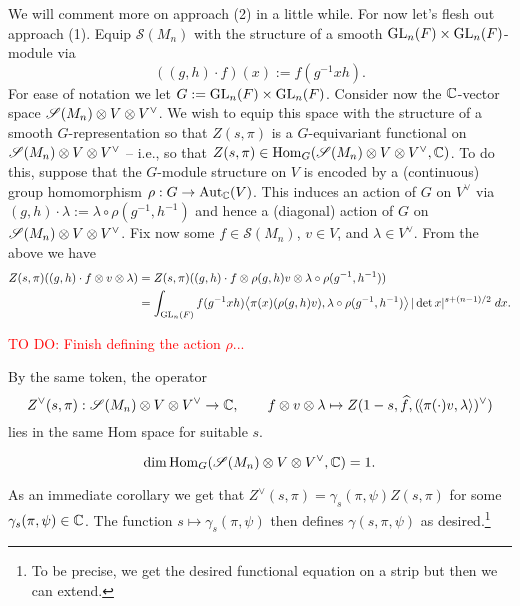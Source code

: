 \documentclass[11pt]{article}
\renewcommand{\S}{\mathscr{S}}
\begin{document}
We will comment more on approach (2) in a little while. For now let's flesh out approach (1). Equip $\S(M_n)$ with the structure of a smooth $\textup{GL}_n(F)\times\textup{GL}_n(F)$-module via
$$((g,h)\cdot f)(x):=f(g^{-1}xh).$$
For ease of notation we let $G:=\textup{GL}_n(F)\times\textup{GL}_n(F)$. Consider now the $\mathbb{C}$-vector space $\S(M_n)\tensor V\tensor V^{\vee}$. We wish to equip this space with the structure of a smooth $G$-representation so that $Z(s,\pi)$ is a $G$-equivariant functional on $\S(M_n)\tensor V\tensor V^{\vee}$ -- i.e., so that $Z(s,\pi)\in\Hom_G(\S(M_n)\tensor V\tensor V^{\vee},\C)$. To do this, suppose that the $G$-module structure on $V$ is encoded by a (continuous) group homomorphism $\rho: G\to\operatorname{Aut}_{\mathbb{C}}(V)$. This induces an action of $G$ on $V^{\vee}$ via $(g,h)\cdot\lambda:=\lambda\circ\rho(g^{-1},h^{-1})$ and hence a (diagonal) action of $G$ on $\S(M_n)\tensor V\tensor V^{\vee}$. Fix now some $f\in\S(M_n)$, $v\in V$, and $\lambda\in V^{\vee}$. From the above we have
\begin{align*}
Z(s,\pi)((g,h)\cdot f\otimes v\otimes\lambda)
&=Z(s,\pi)((g,h)\cdot f\otimes\rho(g,h)v\otimes\lambda\circ\rho(g^{-1},h^{-1})) \\
&=\int_{\textup{GL}_n(F)}f(g^{-1}xh)\!\left\langle\pi(x)(\rho(g,h)v),\lambda\circ\rho(g^{-1},h^{-1})\right\rangle|\det x|^{s+(n-1)/2}\;dx.
\end{align*}

\textcolor{red}{TO DO: Finish defining the action $\rho$...}

By the same token, the operator
$$Z^{\vee}(s,\pi): \S(M_n)\tensor V\tensor V^{\vee}\to\C,\qquad f\tensor v\tensor\lambda\mapsto Z(1-s,\w{f},(\ip{\pi(\cdot)v,\lambda})^{\vee})$$
lies in the same Hom space for suitable $s$.

\begin{theorem}
$$\dim\Hom_G(\S(M_n)\tensor V\tensor V^{\vee},\C)=1.$$
\end{theorem}

As an immediate corollary we get that $Z^{\vee}(s,\pi)=\gamma_s(\pi,\psi)Z(s,\pi)$ for some $\gamma_s(\pi,\psi)\in\mathbb{C}$. The function $s\mapsto\gamma_s(\pi,\psi)$ then defines $\gamma(s,\pi,\psi)$ as desired.\footnote{To be precise, we get the desired functional equation on a strip but then we can extend.}
\end{document}
